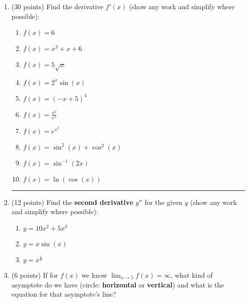\documentclass[11pt]{article}
\begin{document}
\begin{enumerate}[itemsep=30pt]
\newpage

\item (30 points) Find the derivative $f'(x)$ (show any work and simplify where possible):
\begin{enumerate}[itemsep=25pt]
    \item{$f(x) = 6$} \\
    \item{$f(x) = x^3 + x + 6$} \\
    \item{$f(x) = 5\sqrt{x}$} \\
    \item{$f(x) = 2^x \sin(x)$} \\
    \item{$f(x) = (-x + 5)^4$} \\
    \item{$f(x) = \displaystyle{\frac{x^2}{e^x}}$} \\
    \item{$f(x) = e^{x^2}$} \\
    \item{$f(x) = \sin^2(x) + \cos^2(x)$} \\
    \item{$f(x) = \sin^{-1}(2x)$} \\
    \item{$f(x) = \ln(\cos(x))$} \\
\end{enumerate}

\newpage


\medskip\hrule


\item (12 points) Find the \textbf{second derivative} $y''$ for the given $y$ (show any work and simplify where possible):

\begin{enumerate}[itemsep=30pt]
    \item{$y = 10x^2 + 5x^3$} \\
    \item{$y = x \sin(x)$} \\
    \item{$y = x^{\frac{1}{3}}$} \\
\end{enumerate}

\item (6 points) If for $f(x)$ we know $\lim_{x \to 5} f(x) = \infty$, what kind of asymptote do we have (circle: \textbf{horizontal} or \textbf{vertical}) and what is the equation for that asymptote's line?


\end{enumerate}
\end{document}
